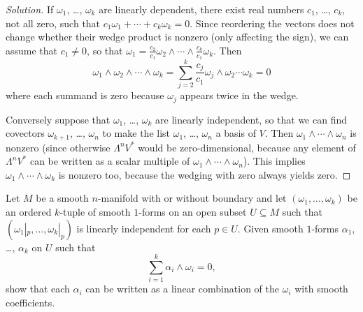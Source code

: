 \documentclass[10pt]{article}
\newenvironment{soln}{\begin{proof}[Solution]}{\end{proof}}
\begin{document}
\begin{soln}
    If $\omega_1$, \dots, $\omega_k$ are linearly dependent,
    there exist real numbers $c_1$, \dots, $c_k$, not all zero, such that
    $c_1\omega_1 + \cdots + c_k\omega_k = 0$.
    Since reordering the vectors does not change whether
    their wedge product is nonzero (only affecting the sign),
    we can assume that $c_1\ne 0$, so that
    $\omega_1 = \frac {c_2}{c_1}\omega_2 \wedge
    \cdots \wedge \frac{c_k}{c_1}\omega_k$. Then
    \begin{equation*}
        \omega_1\wedge\omega_2\wedge\cdots\wedge\omega_k
	= \sum_{j=2}^k \frac{c_j}{c_1}\omega_j\wedge\omega_2\cdots\omega_k
	= 0
    \end{equation*}
    where each summand is zero because $\omega_j$ appears twice in the wedge.

    Conversely suppose that $\omega_1$, \dots, $\omega_k$
    are linearly independent, so that we can find covectors
    $\omega_{k+1}$, \dots, $\omega_n$ to make the list
    $\omega_1$, \dots, $\omega_n$ a basis of $V$. Then
    $\omega_1\wedge\cdots\wedge\omega_n$ is nonzero
    (since otherwise $\Lambda^nV^*$ would be zero-dimensional,
    because any element of $\Lambda^nV^*$ can be written
    as a scalar multiple of $\omega_1\wedge\cdots\wedge\omega_n$).
    This implies $\omega_1\wedge\cdots\wedge\omega_k$ is nonzero too,
    because the wedging with zero always yields zero.
\end{soln}

\begin{problem}
    [14-5]
    Let $M$ be a smooth $n$-manifold with or without boundary
    and let $(\omega_1,\dots,\omega_k)$ be an ordered $k$-tuple
    of smooth $1$-forms on an open subset $U\subseteq M$
    such that $(\omega_1|_p,\dots,\omega_k|_{p})$
    is linearly independent for each $p\in U$.
    Given smooth $1$-forms $\alpha_1$, \dots, $\alpha_k$ on $U$ such that
    \begin{equation*}
	\sum_{i=1}^k \alpha_i\wedge\omega_i = 0,
    \end{equation*}
    show that each $\alpha_i$ can be written as
    a linear combination of the $\omega_i$ with smooth coefficients.
\end{problem}
\end{document}

